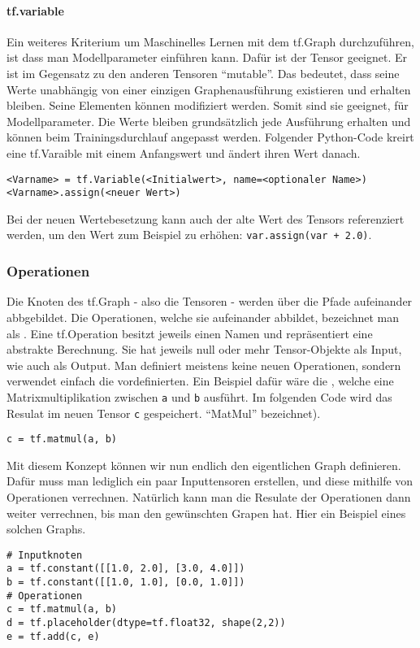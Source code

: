 \paragraph{tf.variable}
Ein weiteres Kriterium um Maschinelles Lernen mit dem tf.Graph durchzuführen,
ist dass man Modellparameter einführen kann. Dafür ist der
 Tensor geeignet. Er ist im Gegensatz zu den anderen
Tensoren ``mutable''. Das bedeutet, dass seine Werte unabhängig von einer
einzigen Graphenausführung existieren und erhalten bleiben. Seine Elementen
können modifiziert werden. Somit sind sie geeignet, für Modellparameter.
Die Werte bleiben grundsätzlich jede Ausführung erhalten und können beim
Trainingsdurchlauf angepasst werden.
\para{}
Folgender Python-Code kreirt eine tf.Varaible mit einem Anfangswert und ändert ihren Wert danach.
\begin{verbatim}
<Varname> = tf.Variable(<Initialwert>, name=<optionaler Name>)
<Varname>.assign(<neuer Wert>)
\end{verbatim}
Bei der neuen Wertebesetzung kann auch der alte Wert des Tensors referenziert
werden, um den Wert zum Beispiel zu erhöhen:
\texttt{var.assign(var + 2.0)}.

\subsubsection{Operationen}
Die Knoten des tf.Graph - also die Tensoren - werden über die Pfade aufeinander
abbgebildet. Die Operationen, welche sie aufeinander abbildet, bezeichnet man
als . Eine tf.Operation besitzt jeweils einen Namen und repräsentiert eine
abstrakte Berechnung. Sie hat jeweils null oder mehr Tensor-Objekte als
Input, wie auch als Output.
\para{}
Man definiert meistens keine neuen Operationen, sondern verwendet einfach die vordefinierten.
Ein Beispiel dafür wäre die , welche eine
Matrixmultiplikation zwischen \texttt{a} und \texttt{b}
ausführt. Im folgenden Code wird das Resulat im neuen Tensor
\texttt{c} gespeichert.
``MatMul'' bezeichnet).
\begin{verbatim}
c = tf.matmul(a, b)
\end{verbatim}
\para{}
Mit diesem Konzept können wir nun endlich den eigentlichen Graph definieren.
Dafür muss man lediglich ein paar Inputtensoren erstellen, und diese mithilfe
von Operationen verrechnen. Natürlich kann man die Resulate der Operationen
dann weiter verrechnen, bis man den gewünschten Grapen hat.
\para{}
Hier ein Beispiel eines solchen Graphs.
\begin{verbatim}
# Inputknoten
a = tf.constant([[1.0, 2.0], [3.0, 4.0]])
b = tf.constant([[1.0, 1.0], [0.0, 1.0]])
# Operationen
c = tf.matmul(a, b)
d = tf.placeholder(dtype=tf.float32, shape(2,2))
e = tf.add(c, e)
\end{verbatim}

